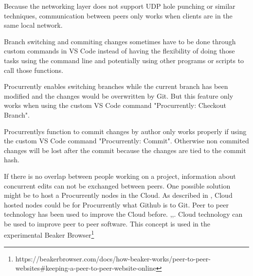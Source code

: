 Because the networking layer does not support UDP hole punching\cite{10.1007/978-3-642-20798-3_1} or similar techniques, communication between peers only works when clients are in the same local network.

Branch switching and commiting changes sometimes have to be done through custom commands in VS Code instead of having the flexibility of doing those tasks using the command line and potentially using other programs or scripts to call those functions.

Procurrently enables switching branches while the current branch has been modified and the changes would be overwritten by Git. But this feature only works when using the custom VS Code command "Procurrently: Checkout Branch".

Procurrentlys function to commit changes by author only works properly if using the custom VS Code command "Procurrently: Commit". Otherwise non commited changes will be lost after the commit because the changes are tied to the commit hash.

If there is no overlap between people working on a project, information about concurrent edits can not be exchanged between peers.
One possible solution might be to host a Procurrently nodes in the Cloud. As described in \cite{6188603}, Cloud hosted nodes could be for Procurrently what Github is to Git. 
Peer to peer technology has been used to improve the Cloud before. \cite{Ranjan2013},\cite{Ranjan2010},\cite{Babaoglu:2012:DIP:2245276.2245357}. Cloud technology can be used to improve peer to peer software. This concept is used in the experimental Beaker Browser\footnote{https://beakerbrowser.com/docs/how-beaker-works/peer-to-peer-websites\#keeping-a-peer-to-peer-website-online}